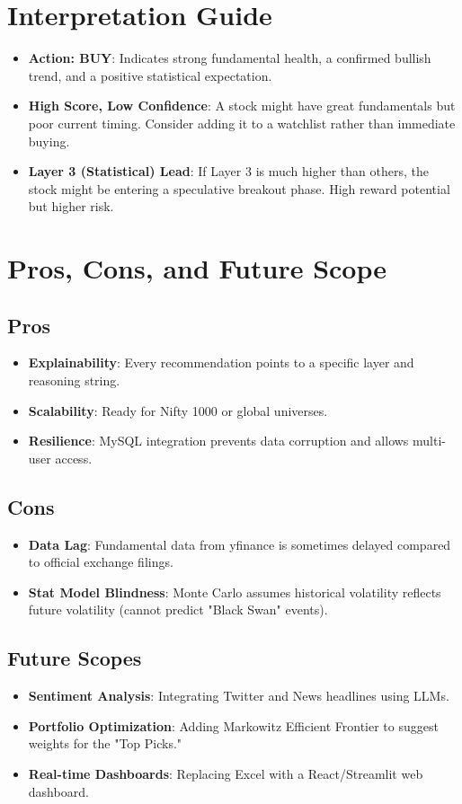 \documentclass{article}
\begin{document}
\section{Interpretation Guide}
\begin{itemize}
    \item \textbf{Action: BUY}: Indicates strong fundamental health, a confirmed bullish trend, and a positive statistical expectation.
    \item \textbf{High Score, Low Confidence}: A stock might have great fundamentals but poor current timing. Consider adding it to a watchlist rather than immediate buying.
    \item \textbf{Layer 3 (Statistical) Lead}: If Layer 3 is much higher than others, the stock might be entering a speculative breakout phase. High reward potential but higher risk.
\end{itemize}

\section{Pros, Cons, and Future Scope}
\subsection{Pros}
\begin{itemize}
    \item \textbf{Explainability}: Every recommendation points to a specific layer and reasoning string.
    \item \textbf{Scalability}: Ready for Nifty 1000 or global universes.
    \item \textbf{Resilience}: MySQL integration prevents data corruption and allows multi-user access.
\end{itemize}

\subsection{Cons}
\begin{itemize}
    \item \textbf{Data Lag}: Fundamental data from yfinance is sometimes delayed compared to official exchange filings.
    \item \textbf{Stat Model Blindness}: Monte Carlo assumes historical volatility reflects future volatility (cannot predict "Black Swan" events).
\end{itemize}

\subsection{Future Scopes}
\begin{itemize}
    \item \textbf{Sentiment Analysis}: Integrating Twitter and News headlines using LLMs.
    \item \textbf{Portfolio Optimization}: Adding Markowitz Efficient Frontier to suggest weights for the "Top Picks."
    \item \textbf{Real-time Dashboards}: Replacing Excel with a React/Streamlit web dashboard.
\end{itemize}
\end{document}

